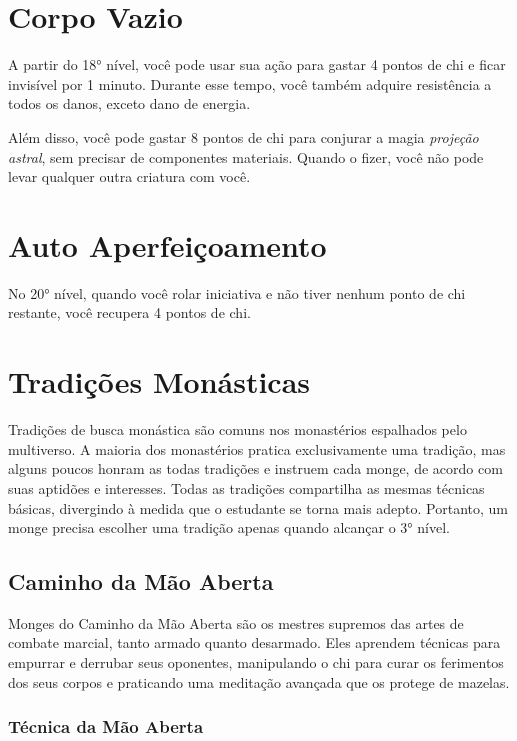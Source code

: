 \begin{multicols}{2}
\section*{Corpo Vazio}%
\label{sec:corpo_vazio}

A partir do 18° nível, você pode usar sua ação para gastar 4 pontos de chi e
ficar invisível por 1 minuto. Durante esse tempo, você também adquire
resistência a todos os danos, exceto dano de energia.

Além disso, você pode gastar 8 pontos de chi para conjurar a magia
\textit{projeção astral}, sem precisar de componentes materiais. Quando o fizer,
você não pode levar qualquer outra criatura com você.

\section*{Auto Aperfeiçoamento}%
\label{sec:auto_aperfeicoamento}

No 20° nível, quando você rolar iniciativa e não tiver nenhum ponto de chi
restante, você recupera 4 pontos de chi.

\section*{Tradições Monásticas}%
\label{sec:tradicoes_monasticas}

Tradições de busca monástica são comuns nos monastérios espalhados pelo
multiverso. A maioria dos monastérios pratica exclusivamente uma tradição, mas
alguns poucos honram as todas tradições e instruem cada monge, de acordo com
suas aptidões e interesses. Todas as tradições compartilha as mesmas técnicas
básicas, divergindo à medida que o estudante se torna mais adepto. Portanto, um
monge precisa escolher uma tradição apenas quando alcançar o 3° nível.

\subsection*{Caminho da Mão Aberta}%
\label{sub:caminho_da_mao_aberta}

Monges do Caminho da Mão Aberta são os mestres supremos das artes de combate
marcial, tanto armado quanto desarmado. Eles aprendem técnicas para empurrar e
derrubar seus oponentes, manipulando o chi para curar os ferimentos dos seus
corpos e praticando uma meditação avançada que os protege de mazelas.

\subsubsection*{Técnica da Mão Aberta}%
\label{ssub:tecnica_da_mao_aberta}


\end{multicols}
